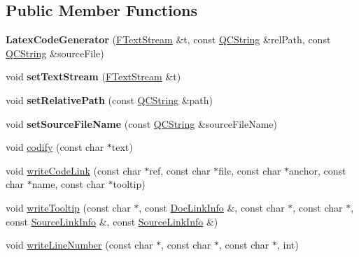 \subsection*{Public Member Functions}
\begin{DoxyCompactItemize}
\item 
\mbox{\label{class_latex_code_generator_a328dc2bc474fbd03a0c4d22abbd09d8d}} 
{\bfseries Latex\+Code\+Generator} (\mbox{\hyperlink{class_f_text_stream}{F\+Text\+Stream}} \&t, const \mbox{\hyperlink{class_q_c_string}{Q\+C\+String}} \&rel\+Path, const \mbox{\hyperlink{class_q_c_string}{Q\+C\+String}} \&source\+File)
\item 
\mbox{\label{class_latex_code_generator_aba0c5c78f5c767bbcdd298ddcb2ec2ba}} 
void {\bfseries set\+Text\+Stream} (\mbox{\hyperlink{class_f_text_stream}{F\+Text\+Stream}} \&t)
\item 
\mbox{\label{class_latex_code_generator_a644dfa222652fa561dc841838100115b}} 
void {\bfseries set\+Relative\+Path} (const \mbox{\hyperlink{class_q_c_string}{Q\+C\+String}} \&path)
\item 
\mbox{\label{class_latex_code_generator_a5b8f6f300e6c8de9f20aa3eb9c1024be}} 
void {\bfseries set\+Source\+File\+Name} (const \mbox{\hyperlink{class_q_c_string}{Q\+C\+String}} \&source\+File\+Name)
\item 
void \mbox{\hyperlink{class_latex_code_generator_a1df8a10f2ab2ef1387d5030e4abd97bb}{codify}} (const char $\ast$text)
\item 
void \mbox{\hyperlink{class_latex_code_generator_adc6118bcab964666e14fd0b7698baba0}{write\+Code\+Link}} (const char $\ast$ref, const char $\ast$file, const char $\ast$anchor, const char $\ast$name, const char $\ast$tooltip)
\item 
void \mbox{\hyperlink{class_latex_code_generator_a1cda601192d87fe472daccdfbabadfce}{write\+Tooltip}} (const char $\ast$, const \mbox{\hyperlink{struct_doc_link_info}{Doc\+Link\+Info}} \&, const char $\ast$, const char $\ast$, const \mbox{\hyperlink{struct_source_link_info}{Source\+Link\+Info}} \&, const \mbox{\hyperlink{struct_source_link_info}{Source\+Link\+Info}} \&)
\item 
void \mbox{\hyperlink{class_latex_code_generator_ae516b197acd77b6c3b432498a4ded811}{write\+Line\+Number}} (const char $\ast$, const char $\ast$, const char $\ast$, int)

\end{DoxyCompactItemize}
